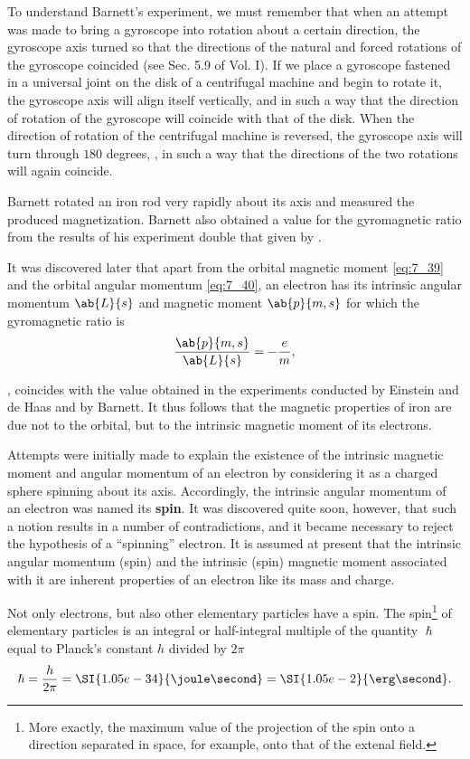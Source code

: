 To understand Barnett's experiment, we must remember that when an attempt was made to bring a gyroscope into rotation about a certain direction, the gyroscope axis turned so that the directions of the natural and forced rotations of the gyroscope coincided (see Sec. 5.9 of Vol. I).
If we place a gyroscope fastened in a universal joint on the disk of a centrifugal machine and begin to rotate it, the gyroscope axis will align itself vertically, and in such a way that the direction of rotation of the gyroscope will coincide with that of the disk.
When the direction of rotation of the centrifugal machine is reversed, the gyroscope axis will turn through $180$ degrees, \ie, in such a way that the directions of the two rotations will again coincide.

Barnett rotated an iron rod very rapidly about its axis and measured the produced magnetization.
Barnett also obtained a value for the gyromagnetic ratio from the results of his experiment double that given by .

It was discovered later that apart from the orbital magnetic moment \eqref{eq:7_39} and the orbital angular momentum \eqref{eq:7_40}, an electron has its intrinsic angular momentum $\ab{L}{s}$ and magnetic moment $\ab{p}{m,s}$ for which the gyromagnetic ratio is
\begin{equation}\label{eq:7_42}
    \frac{\ab{p}{m,s}}{\ab{L}{s}} = - \frac{e}{m},
\end{equation}

\noindent
\ie, coincides with the value obtained in the experiments conducted by Einstein and de Haas and by Barnett.
It thus follows that the magnetic properties of iron are due not to the orbital, but to the intrinsic magnetic moment of its electrons.

Attempts were initially made to explain the existence of the intrinsic magnetic moment and angular momentum of an electron by considering it as a charged sphere spinning about its axis.
Accordingly, the intrinsic angular momentum of an electron was named its \textbf{spin}.
It was discovered quite soon, however, that such a notion results in a number of contradictions, and it became necessary to reject the hypothesis of a ``spinning'' electron.
It is assumed at present that the intrinsic angular momentum (spin) and the intrinsic (spin) magnetic moment associated with it are inherent properties of an electron like its mass and charge.

Not only electrons, but also other elementary particles have a spin.
The spin\footnote{More exactly, the maximum value of the projection of the spin onto a direction separated in space, for example, onto that of the extenal field.} of elementary particles is an integral or half-integral multiple of the quantity $\hslash$ equal to Planck's constant $h$ divided by $2\pi$
\begin{equation}\label{eq:7_43}
    \hslash = \frac{h}{2\pi} = \SI{1.05e-34}{\joule\second} = \SI{1.05e-2}{\erg\second}.
\end{equation}

